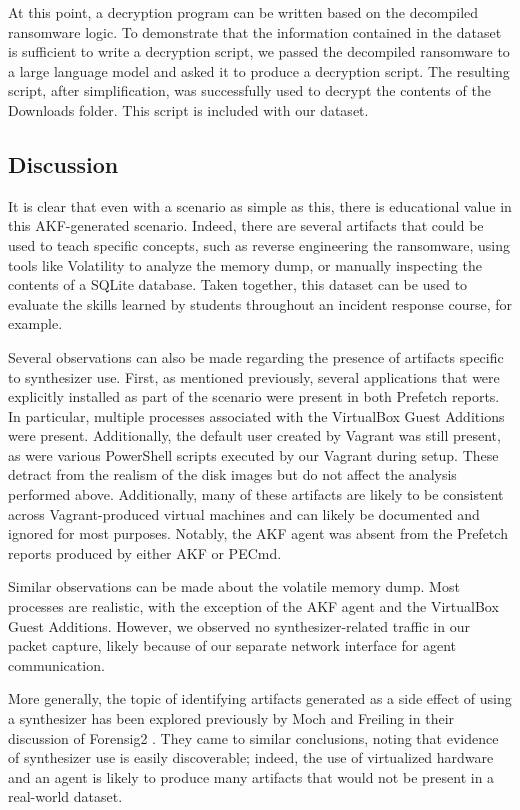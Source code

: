 \documentclass[final,5p,times,twocolumn]{elsarticle}
\begin{document}
At this point, a decryption program can be written based on the
decompiled ransomware logic. To demonstrate that the information
contained in the dataset is sufficient to write a decryption script, we
passed the decompiled ransomware to a large language model and asked it
to produce a decryption script. The resulting script, after
simplification, was successfully used to decrypt the contents of the
Downloads folder. This script is included with our dataset.

\subsection{Discussion}\label{discussion}

It is clear that even with a scenario as simple as this, there is
educational value in this AKF-generated scenario. Indeed, there are
several artifacts that could be used to teach specific concepts, such as
reverse engineering the ransomware, using tools like Volatility to
analyze the memory dump, or manually inspecting the contents of a SQLite
database. Taken together, this dataset can be used to evaluate the
skills learned by students throughout an incident response course, for
example.

Several observations can also be made regarding the presence of
artifacts specific to synthesizer use. First, as mentioned previously,
several applications that were explicitly installed as part of the
scenario were present in both Prefetch reports. In particular, multiple
processes associated with the VirtualBox Guest Additions were present.
Additionally, the default user created by Vagrant was still present, as
were various PowerShell scripts executed by our Vagrant during setup.
These detract from the realism of the disk images but do not affect the
analysis performed above. Additionally, many of these artifacts are
likely to be consistent across Vagrant-produced virtual machines and can
likely be documented and ignored for most purposes. Notably, the AKF
agent was absent from the Prefetch reports produced by either AKF or
PECmd.

Similar observations can be made about the volatile memory dump. Most
processes are realistic, with the exception of the AKF agent and the
VirtualBox Guest Additions. However, we observed no synthesizer-related
traffic in our packet capture, likely because of our separate network
interface for agent communication.

More generally, the topic of identifying artifacts generated as a side
effect of using a synthesizer has been explored previously by Moch and
Freiling in their discussion of Forensig2
\cite{mochForensicImageGenerator2009,mochEvaluatingForensicImage2012}.
They came to similar conclusions, noting that evidence of synthesizer
use is easily discoverable; indeed, the use of virtualized hardware and
an agent is likely to produce many artifacts that would not be present
in a real-world dataset.
\end{document}
